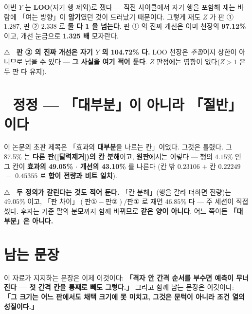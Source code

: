 \documentclass{article}
\begin{document}
이번 $Y$ 는 \textbf{LOO}(자기 행 제외)로 쟀다 --- 직전 사이클에서 자기 행을 포함해 재는 바람에
「여는 방향」이 \textbf{암기}였던 것이 드러났기 때문이다.
그렇게 재도 $Z$ 가 판 ① $1.287$, 판 ② $2.338$ 로 \textbf{둘 다 1 을 넘는다}.
판 ① 의 진짜 개선은 이미 천장의 \textbf{97.12\%} 이고, 개선 눈금으로 \textbf{1.325 배} 모자란다.

⚠ 🔴 \textbf{판 ② 의 진짜 개선은 자기 $Y$ 의 104.72\% 다.}
LOO 천장은 \emph{추정}이지 상한이 아니므로 넘을 수 있다 --- \textbf{그 사실을 여기 적어 둔다}.
$Z$ 판정에는 영향이 없다($Z>1$ 은 두 판 다 유지).

\section{🔴 정정 --- 「대부분」이 아니라 「절반」이다}

이 논문의 초판 제목은 「효과의 \textbf{대부분}을 나르는 칸」이었다. 그것은 틀렸다.
그 87.5\% 는 \textbf{다른 판([달력제거])의 칸 분해}이고, \textbf{원판}에서는 이렇다 ---
행의 $4.15\%$ 인 그 칸이 \textbf{효과의 49.05\% $\cdot$ 개선의 43.10\%} 를 나른다
(칸 밖 $0.23106$ $+$ 칸 $0.22249$ $=$ $0.45355$ 로 \textbf{합이 전량과 비트 일치}).

⚠ 🔴 \textbf{두 정의가 갈린다는 것도 적어 둔다.} 「칸 분해」(행을 갈라 더하면 전량)는 $49.05\%$ 이고,
「판 차이」$(\text{판}①-\text{판}②)/\text{판}①$ 로 재면 $\mathbf{46.85\%}$ 다 --- 주 세션이 직접 셌다.
후자는 기준 팔의 분모까지 함께 바뀌므로 \textbf{같은 양이 아니다}.
어느 쪽이든 \textbf{「대부분」은 아니다.}

\section{남는 문장}

이 자료가 지지하는 문장은 이제 이것이다:
\textbf{「격자 안 간격 순서를 부수면 예측이 무너진다 --- 첫 간격 칸을 통째로 빼도 그렇다.」}
그리고 함께 남는 문장은 이것이다:
\textbf{「그 크기는 어느 판에서도 채택 크기에 못 미치고, 그것은 문턱이 아니라 조건 열의 성질이다.」}
\end{document}
